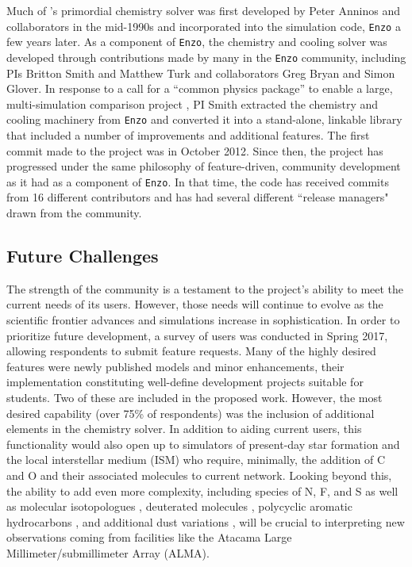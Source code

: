 Much of \grackle{}'s primordial chemistry solver was first developed
by Peter Anninos and collaborators in the mid-1990s
\citep{1997NewA....2..209A, 1997NewA....2..181A} and incorporated into
the simulation code, \texttt{Enzo} \citep[][licensed under the
  3-clause, revised BSD license]{2014ApJS..211...19B} a few
years later.  As a component of \texttt{Enzo}, the chemistry and
cooling solver was developed through contributions made by many in the
\texttt{Enzo} community, including PIs Britton Smith and Matthew Turk
and collaborators Greg Bryan and Simon Glover.  In response to a call for
a ``common physics package'' to enable a large, multi-simulation
comparison project \citep[AGORA,][]{2014ApJS..210...14K,
  2016ApJ...833..202K}, PI Smith extracted the chemistry and
cooling machinery from \texttt{Enzo} and converted it into a
stand-alone, linkable library that included a number of improvements
and additional features.  The first commit made to the \grackle{}
project was in October 2012.  Since then, the project has progressed
under the same philosophy of feature-driven, community development as
it had as a component of \texttt{Enzo}.  In that time, the code has
received commits from 16 different contributors and has had several different
``release managers" drawn from the community.

\subsection{Future Challenges}

The strength of the \grackle{} community is a testament to the
project's ability to meet the current needs of its users.  However,
those needs will continue to evolve as the scientific frontier
advances and simulations increase in sophistication.  In order to
prioritize future development, a survey of \grackle{} users was
conducted in Spring 2017, allowing respondents to submit feature
requests.  Many of the highly desired features were newly published
models and minor enhancements, their implementation constituting
well-define development projects suitable for students.  Two of these
are included in the proposed work.  However, the most desired
capability (over 75\% of respondents) was the inclusion of additional
elements in the chemistry solver.  In addition to aiding current
users, this functionality would also open \grackle{} up to simulators
of present-day star formation and the local interstellar medium (ISM)
who require, minimally, the addition of C and O and their
associated molecules to  current network.  Looking beyond
this, the ability to add even more complexity, including species of
N, F, and S as well as molecular isotopologues
\citep{2008ApJ...679..481P}, deuterated molecules
\citep{2005ApJ...619..379C}, polycyclic aromatic hydrocarbons
\citep[PAHs,][]{2016JPhCS.728f2005G}, and
additional dust variations \citep{2013RvMP...85.1021T}, will be crucial
to interpreting new observations coming from facilities like the
Atacama Large Millimeter/submillimeter Array (ALMA).

